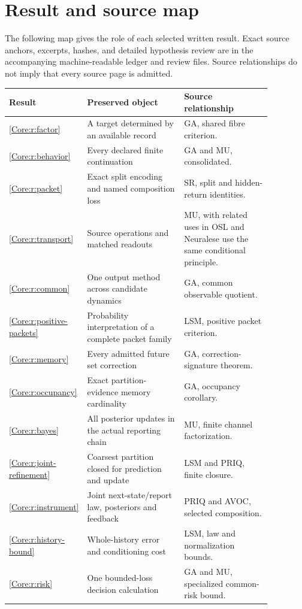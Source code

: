 \documentclass[11pt,oneside,openany]{book}
\numberwithin{equation}{section}
\begin{document}
\chapter{Result and source map}\label{Core:app:map}
The following map gives the role of each selected written result. Exact source anchors, excerpts, hashes, and detailed hypothesis review are in the accompanying machine-readable ledger and review files. Source relationships do not imply that every source page is admitted.
\small
\begin{longtable}{p{0.13\linewidth}p{0.39\linewidth}p{0.35\linewidth}}
\toprule Result & Preserved object & Source relationship\\\midrule\endhead
\ref{Core:r:factor} & A target determined by an available record & GA, shared fibre criterion.\\
\ref{Core:r:behavior} & Every declared finite continuation & GA and MU, consolidated.\\
\ref{Core:r:packet} & Exact split encoding and named composition loss & SR, split and hidden-return identities.\\
\ref{Core:r:transport} & Source operations and matched readouts & MU, with related uses in OSL and Neuralese use the same conditional principle.\\
\ref{Core:r:common} & One output method across candidate dynamics & GA, common observable quotient.\\
\ref{Core:r:positive-packets} & Probability interpretation of a complete packet family & LSM, positive packet criterion.\\
\ref{Core:r:memory} & Every admitted future set correction & GA, correction-signature theorem.\\
\ref{Core:r:occupancy} & Exact partition-evidence memory cardinality & GA, occupancy corollary.\\
\ref{Core:r:bayes} & All posterior updates in the actual reporting chain & MU, finite channel factorization.\\
\ref{Core:r:joint-refinement} & Coarsest partition closed for prediction and update & LSM and PRIQ, finite closure.\\
\ref{Core:r:instrument} & Joint next-state/report law, posteriors and feedback & PRIQ and AVOC, selected composition.\\
\ref{Core:r:history-bound} & Whole-history error and conditioning cost & LSM, law and normalization bounds.\\
\ref{Core:r:risk} & One bounded-loss decision calculation & GA and MU, specialized common-risk bound.\\

\end{longtable}
\end{document}
